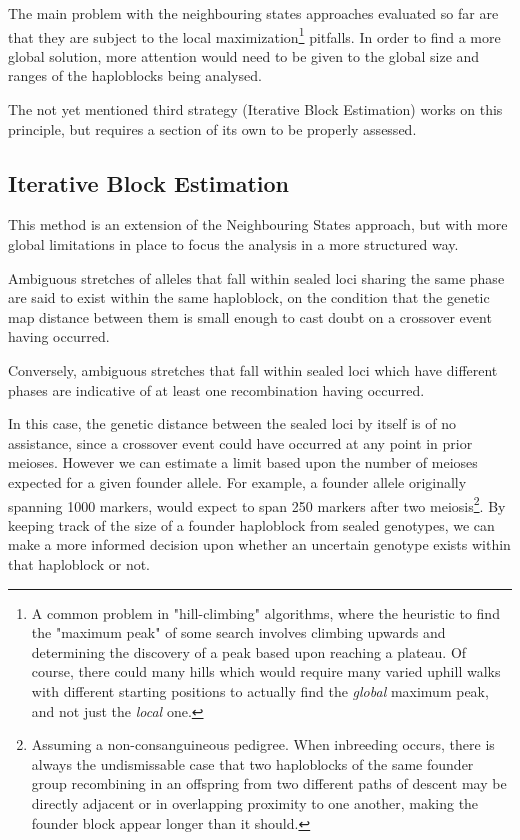 The main problem with the neighbouring states approaches evaluated so far are that they are subject to the local maximization\footnote{A common problem in "hill-climbing" algorithms, where the heuristic to find the "maximum peak" of some search involves climbing upwards and determining the discovery of a peak based upon reaching a plateau. Of course, there could many hills which would require many varied uphill walks with different starting positions to actually find the \textit{global} maximum peak, and not just the \textit{local} one.} pitfalls. In order to find a more global solution, more attention would need to be given to the global size and ranges of the haploblocks being analysed.

The not yet mentioned third strategy (Iterative Block Estimation) works on this principle, but requires a section of its own to be properly assessed.


\subsection{Iterative Block Estimation}

This method is an extension of the Neighbouring States approach, but with more global limitations in place to focus the analysis in a more structured way.

Ambiguous stretches of alleles that fall within sealed loci sharing the same phase are said to exist within the same haploblock, on the condition that the genetic map distance between them is small enough to cast doubt on a crossover event having occurred. 

Conversely, ambiguous stretches that fall within sealed loci which have different phases are indicative of at least one recombination having occurred. 

In this case, the genetic distance between the sealed loci by itself is of no assistance, since a crossover event could have occurred at any point in prior meioses.  However we can estimate a limit based upon the number of meioses expected for a given founder allele. For example, a founder allele originally spanning 1000 markers, would expect to span 250 markers after two meiosis\footnote{\label{footnote:consang}Assuming a non-consanguineous pedigree. When inbreeding occurs, there is always the undismissable case that two haploblocks of the same founder group recombining in an offspring from two different paths of descent may be directly adjacent or in overlapping proximity to one another, making the founder block appear longer than it should.}. By keeping track of the size of a founder haploblock from sealed genotypes, we can make a more informed decision upon whether an uncertain genotype exists within that haploblock or not.


